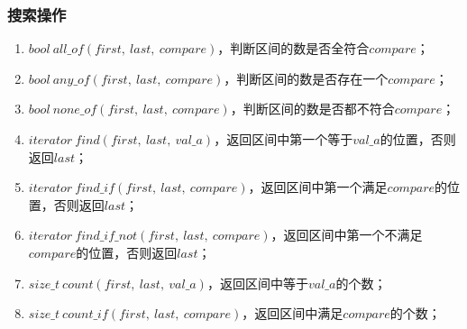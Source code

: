 \subsubsection{搜索操作}
\begin{enumerate}
    \item $bool\ all\_of(first,\ last,\ compare)$，判断区间的数是否全符合$compare$；
    \item $bool\ any\_of(first,\ last,\ compare)$，判断区间的数是否存在一个$compare$；
    \item $bool\ none\_of(first,\ last,\ compare)$，判断区间的数是否都不符合$compare$；
    \item $iterator\ find(first,\ last,\ val\_a)$，返回区间中第一个等于$val\_a$的位置，否则返回$last$；
    \item $iterator\ find\_if(first,\ last,\ compare)$，返回区间中第一个满足$compare$的位置，否则返回$last$；
    \item $iterator\ find\_if\_not(first,\ last,\ compare)$，返回区间中第一个不满足$compare$的位置，否则返回$last$；
    \item $size\_t\ count(first,\ last,\ val\_a)$，返回区间中等于$val\_a$的个数；
    \item $size\_t\ count\_if(first,\ last,\ compare)$，返回区间中满足$compare$的个数；
\end{enumerate}